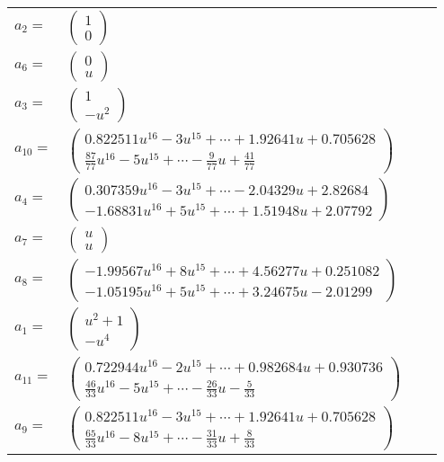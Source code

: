 \documentclass[1p]{elsarticle_modified}
\theoremstyle{definition}
\begin{document}
\begin{tabular}{m{7pt} m{180pt} m{7pt} m{180pt} }
\flushright $a_{2}=$&$\begin{pmatrix}1\\0\end{pmatrix}$ \\
\flushright $a_{6}=$&$\begin{pmatrix}0\\u\end{pmatrix}$ \\
\flushright $a_{3}=$&$\begin{pmatrix}1\\- u^2\end{pmatrix}$ \\
\flushright $a_{10}=$&$\begin{pmatrix}0.822511 u^{16}-3 u^{15}+\cdots+1.92641 u+0.705628\\\frac{87}{77} u^{16}-5 u^{15}+\cdots-\frac{9}{77} u+\frac{41}{77}\end{pmatrix}$ \\
\flushright $a_{4}=$&$\begin{pmatrix}0.307359 u^{16}-3 u^{15}+\cdots-2.04329 u+2.82684\\-1.68831 u^{16}+5 u^{15}+\cdots+1.51948 u+2.07792\end{pmatrix}$ \\
\flushright $a_{7}=$&$\begin{pmatrix}u\\u\end{pmatrix}$ \\
\flushright $a_{8}=$&$\begin{pmatrix}-1.99567 u^{16}+8 u^{15}+\cdots+4.56277 u+0.251082\\-1.05195 u^{16}+5 u^{15}+\cdots+3.24675 u-2.01299\end{pmatrix}$ \\
\flushright $a_{1}=$&$\begin{pmatrix}u^2+1\\- u^4\end{pmatrix}$ \\
\flushright $a_{11}=$&$\begin{pmatrix}0.722944 u^{16}-2 u^{15}+\cdots+0.982684 u+0.930736\\\frac{46}{33} u^{16}-5 u^{15}+\cdots-\frac{26}{33} u-\frac{5}{33}\end{pmatrix}$ \\
\flushright $a_{9}=$&$\begin{pmatrix}0.822511 u^{16}-3 u^{15}+\cdots+1.92641 u+0.705628\\\frac{65}{33} u^{16}-8 u^{15}+\cdots-\frac{31}{33} u+\frac{8}{33}\end{pmatrix}$ \\

\end{tabular}
\end{document}
